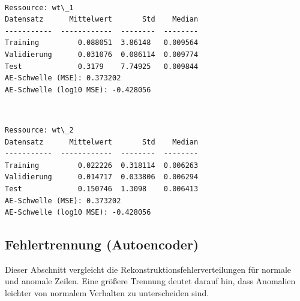 \documentclass[11pt]{article}
\begin{document}
    \begin{center}
    \end{center}
    { \hspace*{\fill} \\}
    
    \begin{Verbatim}[commandchars=\\\{\}]
Ressource: wt\_1
Datensatz      Mittelwert       Std    Median
-----------  ------------  --------  --------
Training         0.088051  3.86148   0.009564
Validierung      0.031076  0.086114  0.009774
Test             0.3179    7.74925   0.009844
AE-Schwelle (MSE): 0.373202
AE-Schwelle (log10 MSE): -0.428056

    \end{Verbatim}

    \begin{center}
    \end{center}
    { \hspace*{\fill} \\}
    
    \begin{Verbatim}[commandchars=\\\{\}]
Ressource: wt\_2
Datensatz      Mittelwert       Std    Median
-----------  ------------  --------  --------
Training         0.022226  0.318114  0.006263
Validierung      0.014717  0.033806  0.006294
Test             0.150746  1.3098    0.006413
AE-Schwelle (MSE): 0.373202
AE-Schwelle (log10 MSE): -0.428056

    \end{Verbatim}

    \subsection{Fehlertrennung
(Autoencoder)}\label{fehlertrennung-autoencoder}

Dieser Abschnitt vergleicht die Rekonstruktionsfehlerverteilungen für
normale und anomale Zeilen. Eine größere Trennung deutet darauf hin,
dass Anomalien leichter von normalem Verhalten zu unterscheiden sind.
\end{document}
